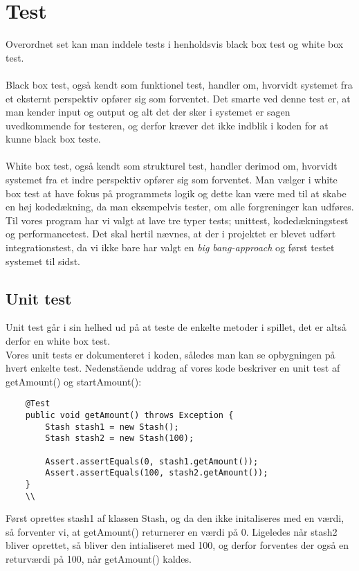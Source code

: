 \chapter{Test}
Overordnet set kan man inddele tests i henholdsvis black box test og white box test.\\\\
Black box test, også kendt som funktionel test, handler om, hvorvidt systemet fra et eksternt perspektiv opfører sig som forventet.
Det smarte ved denne test er, at man kender input og output og alt det der sker i systemet er sagen uvedkommende for testeren, og derfor kræver det ikke indblik i koden for at kunne black box teste.\\\\
White box test, også kendt som strukturel test, handler derimod om, hvorvidt systemet fra et indre perspektiv opfører sig som forventet.
Man vælger i white box test at have fokus på programmets logik og dette kan være med til at skabe en høj kodedækning, da man eksempelvis tester, om alle forgreninger kan udføres.
\\Til vores program har vi valgt at lave tre typer tests; unittest, kodedækningstest og performancetest. 
Det skal hertil nævnes, at der i projektet er blevet udført integrationstest, da vi ikke bare har valgt en \textit{big bang-approach} og først testet systemet til sidst.
\section{Unit test}
Unit test går i sin helhed ud på at teste de enkelte metoder i spillet, det er altså derfor en white box test. \\
Vores unit tests er dokumenteret i koden, således man kan se opbygningen på hvert enkelte test.
Nedenstående uddrag af vores kode beskriver en unit test af getAmount() og startAmount():\\
\begin{lstlisting}
    @Test
    public void getAmount() throws Exception {
        Stash stash1 = new Stash();
        Stash stash2 = new Stash(100);

        Assert.assertEquals(0, stash1.getAmount());
        Assert.assertEquals(100, stash2.getAmount());
    }
    \\
\end{lstlisting}
Først oprettes stash1 af klassen Stash, og da den ikke initaliseres med en værdi, så forventer vi, at getAmount() returnerer en værdi på 0.
Ligeledes når stash2 bliver oprettet, så bliver den intialiseret med 100, og derfor forventes der også en returværdi på 100, når getAmount() kaldes.

